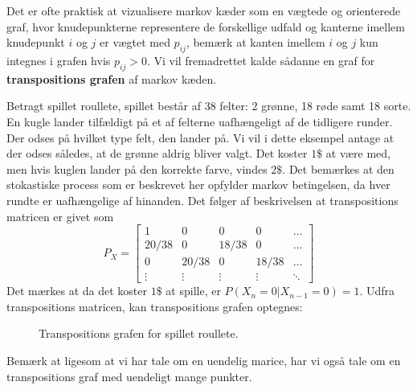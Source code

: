Det er ofte praktisk at vizualisere markov kæder som en vægtede og orienterede graf, hvor knudepunkterne representere de forskellige udfald og kanterne imellem knudepunkt $i$ og $j$ er vægtet med $p_{ij}$, bemærk at kanten imellem $i$ og $j$ kun integnes i grafen hvis $p_{ij} > 0$. Vi vil fremadrettet kalde sådanne en graf for \textbf{transpositions grafen} af markov kæden.
\begin{example}
  Betragt spillet roullete, spillet består af 38 felter: 2 grønne, 18 røde samt 18 sorte. En kugle lander tilfældigt på et af felterne uafhængeligt af de tidligere runder. Der odses på hvilket type felt, den lander på. Vi vil i dette eksempel antage at der odses således, at de grønne aldrig bliver valgt. Det koster $1\$$ at være med, men hvis kuglen lander på den korrekte farve, vindes $2\$$. Det bemærkes at den stokastiske process som er beskrevet her opfylder markov betingelsen, da hver rundte er uafhængelige af hinanden. Det følger af beskrivelsen at transpositions matricen er givet som
  \begin{equation} \label{eq:transpositions_graf_roullete}
    P_{X} = \begin{bmatrix}
              1 & 0 & 0 & 0 & \ldots \\
              20 / 38 & 0 & 18 / 38 & 0 & \ldots \\
              0 & 20 / 38 & 0 & 18 / 38 & \ldots \\
              \vdots & \vdots & \vdots & \vdots & \ddots
            \end{bmatrix}
  \end{equation}
  Det mærkes at da det koster $1 \$$ at spille, er $P(X_n = 0 | X_{n-1} = 0) = 1$. Udfra transpositions matricen, kan transpositions grafen optegnes:
  \begin{figure}[H]
    \centering
    \caption{Transpositions grafen for spillet roullete.}
    \label{fig:transpositions_graf_roullete}
  \end{figure}\noindent
  Bemærk at ligesom at vi har tale om en uendelig marice, har vi også tale om en transpositions graf med uendeligt mange punkter.
\end{example}

